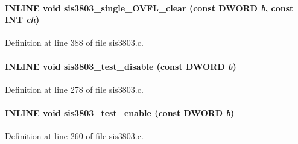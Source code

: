 \paragraph[{sis3803\_\-single\_\-OVFL\_\-clear}]{\setlength{\rightskip}{0pt plus 5cm}INLINE void sis3803\_\-single\_\-OVFL\_\-clear (const {\bf DWORD} {\em b}, \/  const {\bf INT} {\em ch})}\hfill\label{sis3803_8h_a343e91c2ad753cc95861f6d852caebb5}


Definition at line 388 of file sis3803.c.
\paragraph[{sis3803\_\-test\_\-disable}]{\setlength{\rightskip}{0pt plus 5cm}INLINE void sis3803\_\-test\_\-disable (const {\bf DWORD} {\em b})}\hfill\label{sis3803_8h_a88997d0e2f9b55ca625b4aec960f53bf}


Definition at line 278 of file sis3803.c.
\paragraph[{sis3803\_\-test\_\-enable}]{\setlength{\rightskip}{0pt plus 5cm}INLINE void sis3803\_\-test\_\-enable (const {\bf DWORD} {\em b})}\hfill\label{sis3803_8h_a430f0ac7fcfa9ada1ddfde6d9c248a8f}


Definition at line 260 of file sis3803.c.